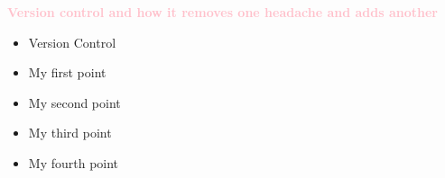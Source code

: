 \documentclass[landscape]{beamer}
\begin{document}
    \begin{frame}
        \thispagestyle{empty}
            \begin{center}
                \huge{\textbf{\textcolor{pink}{Version control and how it removes one headache and adds another}}}
            \end{center}
    \end{frame}

    \begin{frame}
        \thispagestyle{empty}
        
            \begin{huge}
                \begin{itemize}
                    \item Version Control
                    \item My first point
                    \item My second point
                    \item My third point
                    \item My fourth point
                \end{itemize}
            \end{huge}
        
    \end{frame}

    \begin{frame}
        \thispagestyle{empty}
    
    \end{frame}

    \begin{frame}
        \thispagestyle{empty}
    
    \end{frame}

    \begin{frame}
        \thispagestyle{empty}
    
    \end{frame}

    \begin{frame}
        \thispagestyle{empty}
    
    \end{frame}
\end{document}
